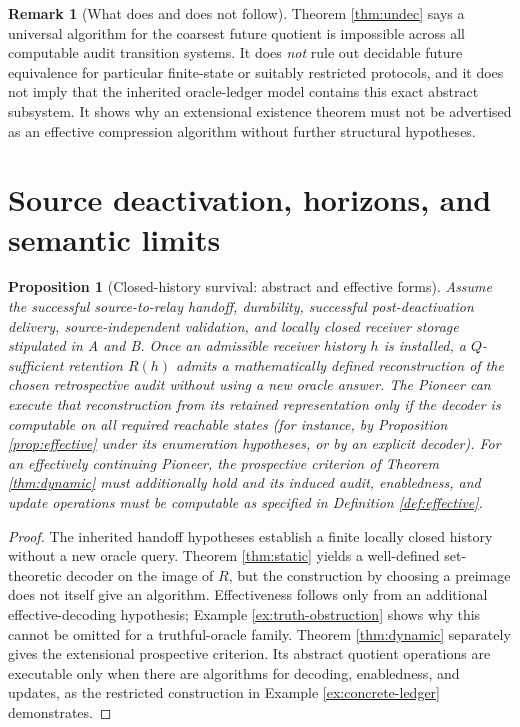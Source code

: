 \documentclass[11pt,letterpaper]{article}
\newtheorem{proposition}[theorem]{Proposition}
\theoremstyle{definition}
\newtheorem{remark}[theorem]{Remark}
\begin{document}
\begin{remark}[What does and does not follow]
Theorem \ref{thm:undec} says a universal algorithm for the coarsest future quotient is impossible across all computable audit transition systems. It does \emph{not} rule out decidable future equivalence for particular finite-state or suitably restricted protocols, and it does not imply that the inherited oracle-ledger model contains this exact abstract subsystem. It shows why an extensional existence theorem must not be advertised as an effective compression algorithm without further structural hypotheses.
\end{remark}

\section{Source deactivation, horizons, and semantic limits}
\begin{proposition}[Closed-history survival: abstract and effective forms]\label{prop:oracle}
Assume the successful source-to-relay handoff, durability, successful post-deactivation delivery, source-independent validation, and locally closed receiver storage stipulated in A and B. Once an admissible receiver history $h$ is installed, a $Q$-sufficient retention $R(h)$ admits a \emph{mathematically defined} reconstruction of the chosen retrospective audit without using a new oracle answer. The Pioneer can \emph{execute} that reconstruction from its retained representation only if the decoder is computable on all required reachable states (for instance, by Proposition \ref{prop:effective} under its enumeration hypotheses, or by an explicit decoder). For an effectively continuing Pioneer, the prospective criterion of Theorem \ref{thm:dynamic} must additionally hold and its induced audit, enabledness, and update operations must be computable as specified in Definition \ref{def:effective}.
\end{proposition}
\begin{proof}
The inherited handoff hypotheses establish a finite locally closed history without a new oracle query. Theorem \ref{thm:static} yields a well-defined set-theoretic decoder on the image of $R$, but the construction by choosing a preimage does not itself give an algorithm. Effectiveness follows only from an additional effective-decoding hypothesis; Example \ref{ex:truth-obstruction} shows why this cannot be omitted for a truthful-oracle family. Theorem \ref{thm:dynamic} separately gives the extensional prospective criterion. Its abstract quotient operations are executable only when there are algorithms for decoding, enabledness, and updates, as the restricted construction in Example \ref{ex:concrete-ledger} demonstrates.
\end{proof}
\end{document}
